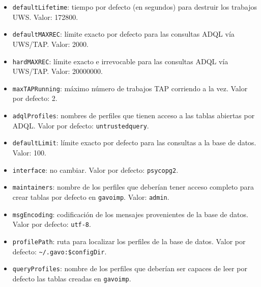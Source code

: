 \begin{itemize}
\begin{itemize}
			\item \verb;defaultLifetime;: tiempo por defecto (en segundos) para destruir los trabajos UWS. Valor: 172800.
			\item \verb;defaultMAXREC;: límite exacto por defecto para las consultas ADQL vía UWS/TAP. Valor: 2000.
			\item \verb;hardMAXREC;: límite exacto e irrevocable para las consultas ADQL vía UWS/TAP. Valor: 20000000.
			\item \verb;maxTAPRunning;: máximo número de trabajos TAP corriendo a la vez. Valor por defecto: 2.
		\end{itemize}
		\begin{itemize}
			\item \verb;adqlProfiles;: nombres de perfiles que tienen acceso a las tablas abiertas por ADQL. Valor por defecto: \verb;untrustedquery;.
			\item \verb;defaultLimit;: límite exacto por defecto para las consultas a la base de datos. Valor: 100.
			\item \verb;interface;: no cambiar. Valor por defecto: \verb;psycopg2;.
			\item \verb;maintainers;: nombre de los perfiles que deberían tener acceso completo para crear tablas por defecto en \verb;gavoimp;. Valor: \verb;admin;.
			\item \verb;msgEncoding;: codificación de los mensajes provenientes de la base de datos. Valor por defecto: \verb;utf-8;.
			\item \verb;profilePath;: ruta para localizar los perfiles de la base de datos. Valor por defecto: \verb;~/.gavo:$configDir;.
			\item \verb;queryProfiles;: nombre de los perfiles que deberían ser capaces de leer por defecto las tablas creadas en \verb;gavoimp;.
		\end{itemize}
\end{itemize}

